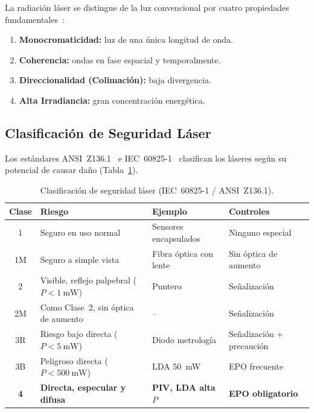 \documentclass[12pt,a4paper]{article}
\begin{document}
La radiación láser se distingue de la luz convencional por cuatro propiedades
fundamentales~\cite{svelto2010,saleh2007}:

\begin{enumerate}
	\item \textbf{Monocromaticidad:} luz de una única longitud de onda.
	\item \textbf{Coherencia:} ondas en fase espacial y temporalmente.
	\item \textbf{Direccionalidad (Colimación):} baja divergencia.
	\item \textbf{Alta Irradiancia:} gran concentración energética.
\end{enumerate}

\subsection{Clasificación de Seguridad Láser}

Los estándares ANSI~Z136.1~\cite{ansi2014} e IEC~60825-1~\cite{iec60825}
clasifican los láseres según su potencial de causar daño
(Tabla~\ref{tab:clases}).

\begin{table}[H]
	\centering
	\caption{Clasificación de seguridad láser (IEC~60825-1 / ANSI~Z136.1).}
	\label{tab:clases}
	\small
	\begin{tabularx}{\textwidth}{c l l X}
		\toprule
		\textbf{Clase} & \textbf{Riesgo}                              & \textbf{Ejemplo}           & \textbf{Controles}        \\
		\midrule
		1              & Seguro en uso normal                         & Sensores encapsulados      & Ninguno especial          \\
		1M             & Seguro a simple vista                        & Fibra óptica con lente     & Sin óptica de aumento     \\
		2              & Visible, reflejo palpebral ($P<\SI{1}{\mW}$) & Puntero                    & Señalización              \\
		2M             & Como Clase~2, sin óptica de aumento          & {--}                       & Señalización              \\
		3R             & Riesgo bajo directa ($P<\SI{5}{\mW}$)        & Diodo metrología           & Señalización + precaución \\
		3B             & Peligroso directa ($P<\SI{500}{\mW}$)        & LDA 50~mW                  & EPO frecuente             \\
		\rowcolor{aerored!20}
		\textbf{4}     & \textbf{Directa, especular y difusa}         & \textbf{PIV, LDA alta $P$} & \textbf{EPO obligatorio}  \\
		\bottomrule
	\end{tabularx}
\end{table}
\end{document}
